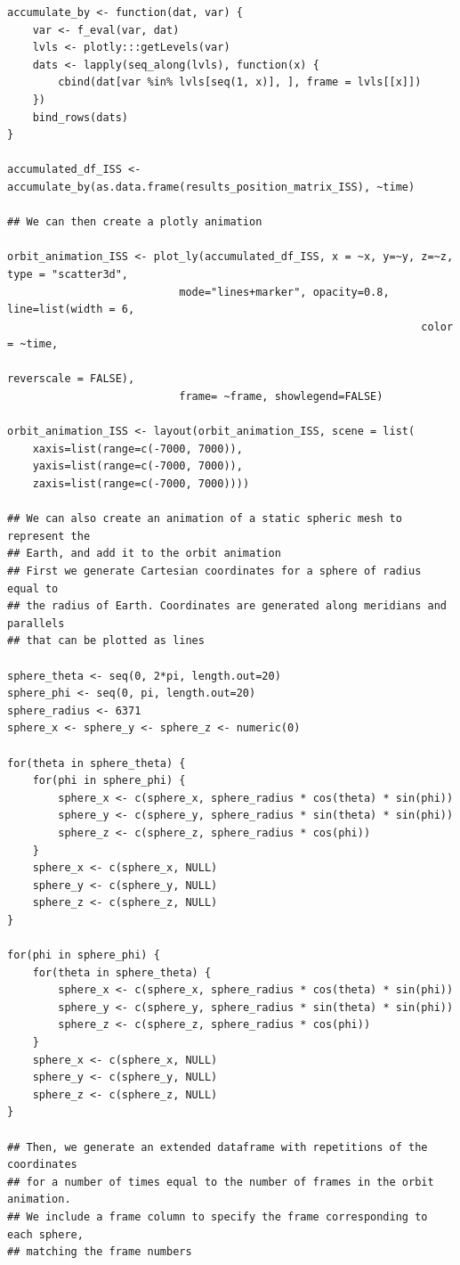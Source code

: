 \begin{verbatim}
accumulate_by <- function(dat, var) {
    var <- f_eval(var, dat)
    lvls <- plotly:::getLevels(var)
    dats <- lapply(seq_along(lvls), function(x) {
        cbind(dat[var %in% lvls[seq(1, x)], ], frame = lvls[[x]])
    })
    bind_rows(dats)
}

accumulated_df_ISS <- accumulate_by(as.data.frame(results_position_matrix_ISS), ~time)

## We can then create a plotly animation

orbit_animation_ISS <- plot_ly(accumulated_df_ISS, x = ~x, y=~y, z=~z, type = "scatter3d",
                           mode="lines+marker", opacity=0.8, line=list(width = 6, 
                                                                 color = ~time, 
                                                                 reverscale = FALSE), 
                           frame= ~frame, showlegend=FALSE)

orbit_animation_ISS <- layout(orbit_animation_ISS, scene = list(
    xaxis=list(range=c(-7000, 7000)),
    yaxis=list(range=c(-7000, 7000)),
    zaxis=list(range=c(-7000, 7000))))

## We can also create an animation of a static spheric mesh to represent the
## Earth, and add it to the orbit animation
## First we generate Cartesian coordinates for a sphere of radius equal to
## the radius of Earth. Coordinates are generated along meridians and parallels
## that can be plotted as lines

sphere_theta <- seq(0, 2*pi, length.out=20)
sphere_phi <- seq(0, pi, length.out=20)
sphere_radius <- 6371
sphere_x <- sphere_y <- sphere_z <- numeric(0)

for(theta in sphere_theta) {
    for(phi in sphere_phi) {
        sphere_x <- c(sphere_x, sphere_radius * cos(theta) * sin(phi))
        sphere_y <- c(sphere_y, sphere_radius * sin(theta) * sin(phi))
        sphere_z <- c(sphere_z, sphere_radius * cos(phi))
    }
    sphere_x <- c(sphere_x, NULL)
    sphere_y <- c(sphere_y, NULL)
    sphere_z <- c(sphere_z, NULL)
}

for(phi in sphere_phi) {
    for(theta in sphere_theta) {
        sphere_x <- c(sphere_x, sphere_radius * cos(theta) * sin(phi))
        sphere_y <- c(sphere_y, sphere_radius * sin(theta) * sin(phi))
        sphere_z <- c(sphere_z, sphere_radius * cos(phi))
    }
    sphere_x <- c(sphere_x, NULL)
    sphere_y <- c(sphere_y, NULL)
    sphere_z <- c(sphere_z, NULL)
}

## Then, we generate an extended dataframe with repetitions of the coordinates
## for a number of times equal to the number of frames in the orbit animation.
## We include a frame column to specify the frame corresponding to each sphere,
## matching the frame numbers


\end{verbatim}
